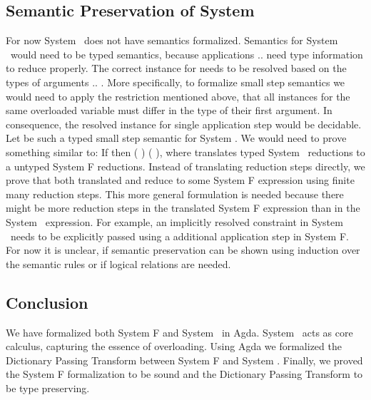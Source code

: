 \subsection{Semantic Preservation of System \Fo}
For now System \Fo\ does not have semantics formalized.
Semantics for System \Fo\ would need to be typed semantics, because applications     $..$   need type information to reduce properly.
The correct instance for  needs to be resolved based on the types of arguments  $..$ . 
More specifically, to formalize small step semantics we would need to apply the restriction mentioned above, that all instances for the same overloaded variable  must differ in the type of their first argument. 
In consequence, the resolved instance for single application step     would be decidable.
Let    be such a typed small step semantic for System \Fo. We would need to prove something similar to: If    then  \Constr{[}  \Constr{]} (   )  (   ), where  translates typed System \Fo\ reductions to a untyped System F reductions.
Instead of translating reduction steps directly, we prove that both translated  and  reduce to some System F expression  using finite many reduction steps.
This more general formulation is needed because there might be more reduction steps in the translated System F expression than in the System \Fo\ expression. 
For example, an implicitly resolved constraint in System \Fo\ needs to be explicitly passed using a additional application step in System F. For now it is unclear, if semantic preservation can be shown using induction over the semantic rules or if logical relations are needed.

\subsection{Conclusion}
We have formalized both System F and System \Fo\ in Agda. 
System \Fo\ acts as core calculus, capturing the essence of overloading.
Using Agda we formalized the Dictionary Passing Transform between System F and System \Fo. 
Finally, we proved the System F formalization to be sound and the Dictionary Passing Transform to be type preserving.